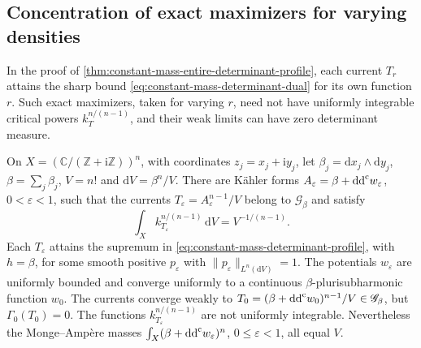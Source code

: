 \subsection{Concentration of exact maximizers for varying densities}
In the proof of \cref{thm:constant-mass-entire-determinant-profile}, each current $T_r$ attains the sharp bound \eqref{eq:constant-mass-determinant-dual} for its own function $r$. Such exact maximizers, taken for varying $r$, need not have uniformly integrable critical powers $k_T^{n/(n-1)}$, and their weak limits can have zero determinant measure.
\begin{theorem}\label{thm:sharp-determinant-power-concentration}
On $X=(\mathbb C/(\mathbb Z+\mathrm i\mathbb Z))^n$, with coordinates $z_j=x_j+\mathrm iy_j$, let $\beta_j=\mathrm dx_j\wedge\mathrm dy_j$, $\beta=\sum_j\beta_j$, $V=n!$ and $\mathrm dV=\beta^n/V$. There are K\"ahler forms
$A_\varepsilon=\beta+\mathrm{dd}^{\mathrm{c}} w_\varepsilon$,
$0<\varepsilon<1$, such that the currents $T_\varepsilon=A_\varepsilon^{n-1}/V$ belong to
$\mathscr G_\beta$ and satisfy
\[
 \int_X k_{T_\varepsilon}^{n/(n-1)}\,\mathrm dV=V^{-1/(n-1)}.
\]
Each $T_\varepsilon$ attains the supremum in \eqref{eq:constant-mass-determinant-profile}, with $h=\beta$, for some smooth positive
$p_\varepsilon$ with $\|p_\varepsilon\|_{L^n(\mathrm dV)}=1$. The potentials $w_\varepsilon$ are uniformly
bounded and converge uniformly to a continuous
$\beta$-plurisubharmonic function $w_0$. The currents converge weakly to
$T_0=(\beta+\mathrm{dd}^{\mathrm{c}} w_0)^{n-1}/V\in\mathscr G_\beta$, but
$\Gamma_0(T_0)=0$. The functions $k_{T_\varepsilon}^{n/(n-1)}$ are not uniformly
integrable. Nevertheless the Monge--Amp\`ere masses $\int_X(\beta+\mathrm{dd}^{\mathrm{c}} w_\varepsilon)^n$, $0\leq\varepsilon<1$,
all equal $V$.
\end{theorem}
